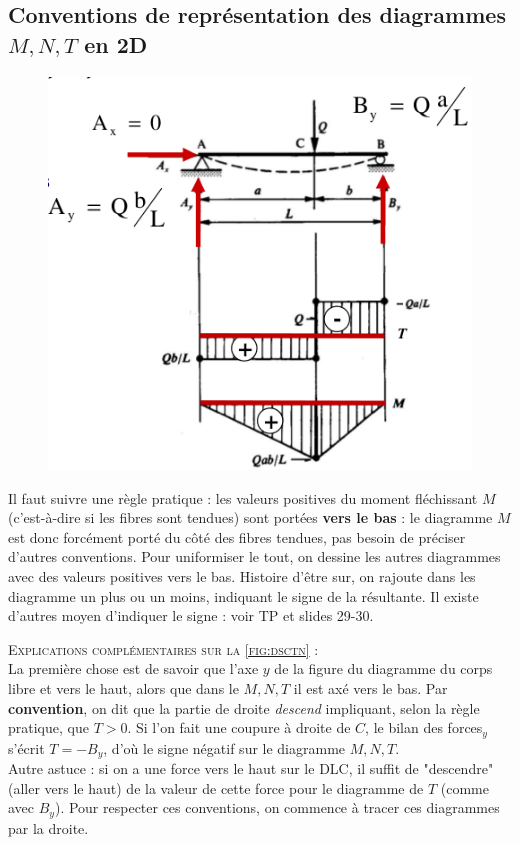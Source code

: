 	\subsection{Conventions de représentation des diagrammes $M, N, T$ 
	en 2D}
	\begin{figure}
	\vspace{-8mm}
	\includegraphics[scale=0.45]{ch2/image8.png}
	\label{fig:dsctn}
	\end{figure}	
	Il faut suivre une règle pratique : les valeurs positives du 
	moment fléchissant $M$ (c'est-à-dire si les fibres sont tendues) 
	sont portées \textbf{vers le bas} : le diagramme $M$ est donc 
	forcément porté du côté des fibres tendues, pas besoin de préciser 
	d'autres conventions. Pour uniformiser le tout, on dessine les autres 
	diagrammes avec des valeurs positives vers le bas. Histoire d'être 
	sur, on rajoute dans les diagramme un plus ou un moins, indiquant 
	le signe de la résultante. Il existe d'autres moyen d'indiquer 
	le signe : voir TP et slides 29-30.
	
	\newpage
	\textsc{Explications complémentaires sur la \autoref{fig:dsctn}} : \\
	La première chose est de savoir que l'axe $y$ de la figure du 
	diagramme du corps libre et vers le haut, alors que dans le 
	$M,N,T$ il est axé vers le bas. Par \textbf{convention}, on dit 
	que la partie de droite \textit{descend} impliquant, selon la 
	règle pratique, que $T>0$. Si l'on fait une coupure à droite de 
	$C$, le bilan des forces$_y$ s'écrit $T=-B_y$, d'où le signe 
	négatif sur le diagramme $M,N,T$.\\
	Autre astuce : si on a une force vers le haut sur le DLC, il 
	suffit de "descendre" (aller vers le haut) de la valeur de cette 
	force pour le diagramme de $T$ (comme avec $B_y$). Pour respecter 
	ces conventions, on commence à tracer ces diagrammes par la 
	droite.\\
	
